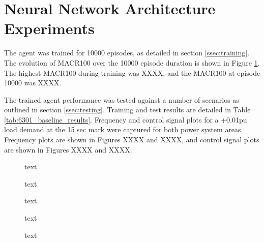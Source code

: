 \section{Neural Network Architecture Experiments}
The agent was trained for 10000 episodes, as detailed in section \ref{ssec:training}. The evolution of MACR100 over the 10000 episode duration is shown in Figure \ref{fig:6301_average_reward}. The highest MACR100 during training was XXXX, and the MACR100 at episode 10000 was XXXX.

The trained agent performance was tested against a number of scenarios as outlined in section \ref{ssec:testing}. Training and test results are detailed in Table \ref{tab:6301_baseline_results}. Frequency and control signal plots for a +0.01pu load demand at the 15 sec mark were captured for both power system areas. Frequency plots are shown in Figures XXXX and XXXX, and control signal plots are shown in Figures XXXX and XXXX.

\vspace{2cm}

\begin{figure}[h]
	\centering
	
	\caption{text}\label{fig:6301_average_reward}
\end{figure}





\begin{figure}[h]
	\centering
	
	
	\caption{text}
	
	
	\caption{text}
	
	
	\caption{text}
			
	
	\caption{text}
\end{figure}